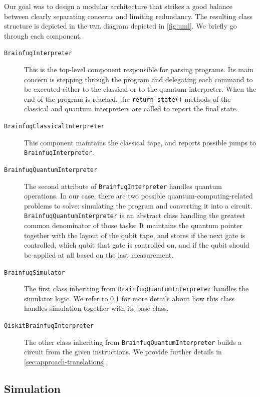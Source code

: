 Our goal was to design a modular architecture that strikes a good balance between clearly separating concerns and limiting redundancy. The resulting class structure is depicted in the \textsc{uml} diagram depicted in \cref{fig:uml}. We briefly go through each component.
\begin{description}
  \item[\texttt{BrainfuqInterpreter}] This is the top-level component responsible for parsing \bfq{} programs. Its main concern is stepping through the program and delegating each command to be executed either to the classical or to the quantum interpreter. When the end of the program is reached, the \texttt{return\_state()} methods of the classical and quantum interpreters are called to report the final state.
  \item[\texttt{BrainfuqClassicalInterpreter}] This component maintains the classical tape, and reports possible jumps to \texttt{BrainfuqInterpreter}.
  \item[\texttt{BrainfuqQuantumInterpreter}] The second attribute of \texttt{BrainfuqInterpreter} handles quantum operations. In our case, there are two possible quantum-computing-related problems to solve: simulating the program and converting it into a \qiskit{} circuit. \texttt{BrainfuqQuantumInterpreter} is an abstract class handling the greatest common denominator of those tasks: It maintains the quantum pointer together with the layout of the qubit tape, and stores if the next gate is controlled, which qubit that gate is controlled on, and if the qubit should be applied at all based on the last measurement.
  \item[\texttt{BrainfuqSimulator}] The first class inheriting from \texttt{BrainfuqQuantumInterpreter} handles the simulator logic. We refer to \cref{sec:approach-quantum-tape} for more details about how this class handles simulation together with its base class.
  \item[\texttt{QiskitBrainfuqInterpreter}] The other class inheriting from \texttt{BrainfuqQuantumInterpreter} builds a \qiskit{} circuit from the given instructions. We provide further details in \cref{sec:approach-translations}.
\end{description}


\subsection{Simulation}
\label{sec:approach-quantum-tape}

